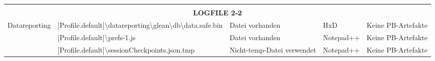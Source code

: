 \begin{appendices}
{\begin{landscape}
\begin{table}[h!]
{\begin{tabular}{cllll}
	                                                                                                              &                                                                                                                                                & \cellcolor[HTML]{FFFFFF}                                                & \cellcolor[HTML]{FFFFFF}                                          & \multicolumn{1}{c}{\cellcolor[HTML]{FFFFFF}}                    \\
	\multicolumn{5}{c}{\textbf{LOGFILE 2-2}}                                                                                                                                                                                                                                                                                                                                                                                                                                       \\ \hline
	\multicolumn{1}{|l|}{Datareporting}                                                                           & \multicolumn{1}{l|}{\cellcolor[HTML]{3190FF}[Profile.default]\textbackslash{}datareporting\textbackslash{}glean\textbackslash{}db\textbackslash{}data.safe.bin} & \multicolumn{1}{l|}{\cellcolor[HTML]{009901}Datei vorhanden}            & \multicolumn{1}{l|}{\cellcolor[HTML]{FFFFFF}HxD}                  & \multicolumn{1}{l|}{\cellcolor[HTML]{F8A102}Keine PB-Artefakte} \\ \hline
	\multicolumn{1}{|c|}{}                                                                                        & \multicolumn{1}{l|}{\cellcolor[HTML]{3190FF}[Profile.default]\textbackslash{}prefs-1.js}                                                                        & \multicolumn{1}{l|}{\cellcolor[HTML]{009901}Datei vorhanden}            & \multicolumn{1}{l|}{\cellcolor[HTML]{FFFFFF}Notepad++}            & \multicolumn{1}{l|}{\cellcolor[HTML]{F8A102}Keine PB-Artefakte} \\ \cline{2-5} 
	\multicolumn{1}{|c|}{}                                                                                        & \multicolumn{1}{l|}{\cellcolor[HTML]{3190FF}[Profile.default]\textbackslash{}sessionCheckpoints.json.tmp}                                                       & \multicolumn{1}{l|}{\cellcolor[HTML]{FCFF2F}Nicht-temp-Datei verwendet} & \multicolumn{1}{l|}{\cellcolor[HTML]{FFFFFF}Notepad++}            & \multicolumn{1}{l|}{\cellcolor[HTML]{F8A102}Keine PB-Artefakte} \\ \cline{2-5} 

\end{tabular}}
\end{table}
\end{landscape}}
\end{appendices}
